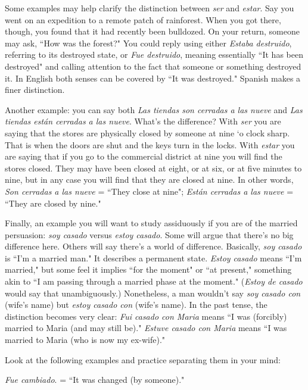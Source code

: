 Some examples may help clarify the distinction between \emph{ser}
and \emph{estar}. Say you went on an expedition to a remote patch of rainforest. When you got there, though, you found that it had recently been
bulldozed. On your return, someone may ask, ``How was the forest?"
You could reply using either \emph{Estaba destruido}, referring to its destroyed state, or \emph{Fue destruido}, meaning essentially ``It has been destroyed" and calling attention to the fact that someone or something
destroyed it. In English both senses can be covered by ``It was destroyed." Spanish makes a finer distinction.

Another example: you can say both \emph{Las tiendas son cerradas a
las nueve} and \emph{Las tiendas están cerradas a las nueve}. What's the difference? With \emph{ser} you are saying that the stores are physically closed
by someone at nine `o clock sharp. That is when the doors are shut and
the keys turn in the locks. With \emph{estar} you are saying that if you go to
the commercial district at nine you will find the stores closed. They
may have been closed at eight, or at six, or at five minutes to nine, but
in any case you will find that they are closed at nine. In other words,
\emph{Son cerradas a las nueve} = ``They close at nine"; \emph{Están cerradas a las
nueve} = ``They are closed by nine."

Finally, an example you will want to study assiduously if you
are of the married persuasion: \emph{soy casado} versus \emph{estoy casado}. Some
will argue that there's no big difference here. Others will say there's a
world of difference. Basically, \emph{soy casado} is ``I'm a married man." It
describes a permanent state. \emph{Estoy casado} means ``I'm married," but
some feel it implies ``for the moment" or ``at present," something akin
to ``I am passing through a married phase at the moment." (\emph{Estoy de
casado} would say that unambiguously.) Nonetheless, a man wouldn't
say \emph{soy casado con} (wife's name) but \emph{estoy casado con} (wife's name).
In the past tense, the distinction becomes very clear: \emph{Fui casado con
Maria} means ``I was (forcibly) married to Maria (and may still be)." \emph{Estuve casado con Maria} means ``I was married to Maria (who is now my ex-wife)."

Look at the following examples and practice separating them
in your mind:

\bsk

\indu \emph{Fue cambiado}. = ``It was changed (by someone)."

